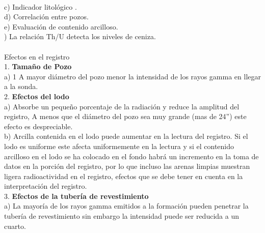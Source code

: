\documentclass[10pt,a4paper]{report}
\begin{document}
\\ c) Indicador litológico .
\\ d) Correlación entre pozos.
\\ e) Evaluación de contenido arcilloso.
\\ ) La relación Th/U detecta los niveles de ceniza.
\\\\ Efectos en el registro
\\ 1. \textbf{Tamaño de Pozo} 
\\ a) 1 A mayor diámetro del pozo menor la intensidad de los rayos gamma en llegar a la sonda.
\\ 2. \textbf{Efectos del lodo}
\\ a) Absorbe un pequeño porcentaje de la radiación y reduce la amplitud del registro, A menos que el diámetro del pozo sea muy grande (mas de 24'') este efecto es despreciable.
\\ b) Arcilla contenida en el lodo puede aumentar en la lectura del registro. Si el lodo es uniforme este afecta uniformemente en la lectura y si el contenido arcilloso en el lodo se ha colocado en el fondo habrá un incremento en la toma de datos en la porción del registro, por lo que incluso las arenas limpias muestran ligera radioactividad en el registro, efectos que se debe tener en cuenta en la interpretación del registro.
\\ 3. \textbf {Efectos de la tubería de revestimiento}
\\ a) La mayoría de los rayos gamma emitidos a la formación pueden penetrar la tubería de revestimiento sin embargo la intensidad puede ser reducida a un cuarto.
\end{document}
